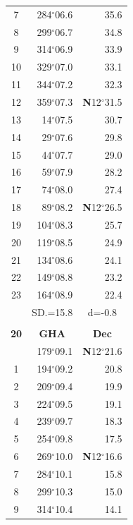 \documentclass[10pt, a4paper]{report}
\begin{document}
\begin{scriptsize}
\begin{tabular*}{0.2\textwidth}[t]{@{\extracolsep{\fill}}|c|rr|}
7 & 284$^\circ$06.6 & 35.6\\
8 & 299$^\circ$06.7 & 34.8\\
9 & 314$^\circ$06.9 & \raisebox{0.24ex}{\boldmath$\cdot$~\boldmath$\cdot$~~}33.9\\
10 & 329$^\circ$07.0 & 33.1\\
11 & 344$^\circ$07.2 & 32.3\\[2Pt]
12 & 359$^\circ$07.3 & \textbf{N}12$^\circ$31.5\\
13 & 14$^\circ$07.5 & 30.7\\
14 & 29$^\circ$07.6 & 29.8\\
15 & 44$^\circ$07.7 & \raisebox{0.24ex}{\boldmath$\cdot$~\boldmath$\cdot$~~}29.0\\
16 & 59$^\circ$07.9 & 28.2\\
17 & 74$^\circ$08.0 & 27.4\\[2Pt]
18 & 89$^\circ$08.2 & \textbf{N}12$^\circ$26.5\\
19 & 104$^\circ$08.3 & 25.7\\
20 & 119$^\circ$08.5 & 24.9\\
21 & 134$^\circ$08.6 & \raisebox{0.24ex}{\boldmath$\cdot$~\boldmath$\cdot$~~}24.1\\
22 & 149$^\circ$08.8 & 23.2\\
23 & 164$^\circ$08.9 & 22.4\\
\hline
\rule{0pt}{2.4ex} & \multicolumn{1}{c}{SD.=15.8} & \multicolumn{1}{c|}{d=-0.8}\\
\hline
\multicolumn{1}{c}{}\\[-0.5ex]\hline
\multicolumn{1}{|c|}{\rule{0pt}{2.6ex}\textbf{20}} & \multicolumn{1}{c}{\textbf{GHA}} & \multicolumn{1}{c|}{\textbf{Dec}}\\
\hline\rule{0pt}{2.6ex}\noindent
0 & 179$^\circ$09.1 & \textbf{N}12$^\circ$21.6\\
1 & 194$^\circ$09.2 & 20.8\\
2 & 209$^\circ$09.4 & 19.9\\
3 & 224$^\circ$09.5 & \raisebox{0.24ex}{\boldmath$\cdot$~\boldmath$\cdot$~~}19.1\\
4 & 239$^\circ$09.7 & 18.3\\
5 & 254$^\circ$09.8 & 17.5\\[2Pt]
6 & 269$^\circ$10.0 & \textbf{N}12$^\circ$16.6\\
7 & 284$^\circ$10.1 & 15.8\\
8 & 299$^\circ$10.3 & 15.0\\
9 & 314$^\circ$10.4 & \raisebox{0.24ex}{\boldmath$\cdot$~\boldmath$\cdot$~~}14.1\\

\end{tabular*}
\end{scriptsize}
\end{document}
